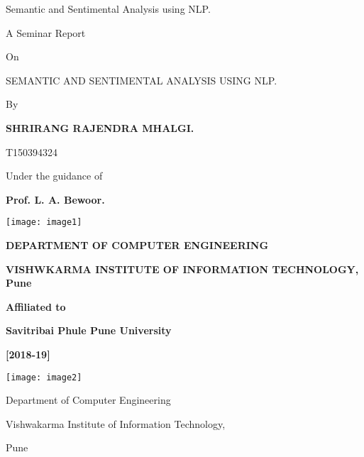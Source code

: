 \documentclass{article} %
\begin{document}


\noindent 

\noindent 

\noindent 

\noindent 

\noindent Semantic and Sentimental Analysis using NLP.

\noindent 

\noindent \eject 

\noindent A Seminar Report

\noindent On

\noindent SEMANTIC AND SENTIMENTAL ANALYSIS USING NLP.

\noindent By

\noindent \textbf{SHRIRANG RAJENDRA MHALGI.}

\noindent T150394324

\noindent Under the guidance of

\noindent \textbf{Prof. L. A. Bewoor.}

\noindent \textbf{}

\noindent \texttt{[image: image1]}

\noindent 

\noindent 

\noindent 

\noindent 

\noindent 

\noindent 

\noindent \textbf{DEPARTMENT OF COMPUTER ENGINEERING}

\noindent \textbf{VISHWKARMA INSTITUTE OF INFORMATION TECHNOLOGY, Pune}

\noindent \textbf{Affiliated to}

\noindent \textbf{Savitribai Phule Pune University }

\noindent \textbf{[2018-19]}

\noindent \textbf{\eject }

\noindent \textbf{}

\noindent \texttt{[image: image2]}

\noindent Department of Computer Engineering\textbf{}

\noindent Vishwakarma Institute of Information Technology, 

\noindent Pune\textbf{}

\noindent \textbf{}
\end{document}
